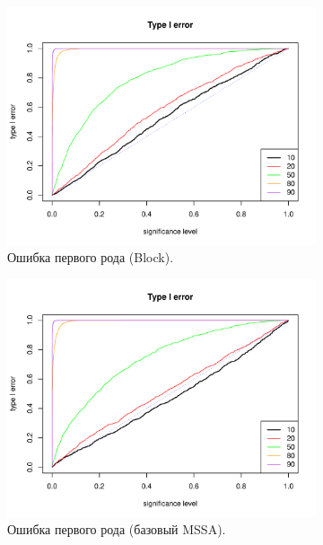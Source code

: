 \documentclass[specialist,
substylefile = spbu_report.rtx,
subf,href,colorlinks=true, 12pt]{disser}
\theoremstyle{definition}
\begin{document}
		\begin{figure}
		\captionsetup[subfigure]{justification=Centering}
		\begin{subfigure}[t]{0.45\textwidth}
			\centering
			\includegraphics[width=\textwidth]{type1error_block_ev.pdf}
			\caption{Ошибка первого рода (Block).}
		\end{subfigure}\hspace{\fill}
		\begin{subfigure}[t]{0.45\textwidth}
			\centering
			\includegraphics[width=\textwidth]{type1error_mssa_ev.pdf}
			\caption{Ошибка первого рода (базовый MSSA).}
		\end{subfigure}
		\bigskip
		\begin{subfigure}[t]{0.45\textwidth}

\end{subfigure}
\end{figure}
\end{document}
